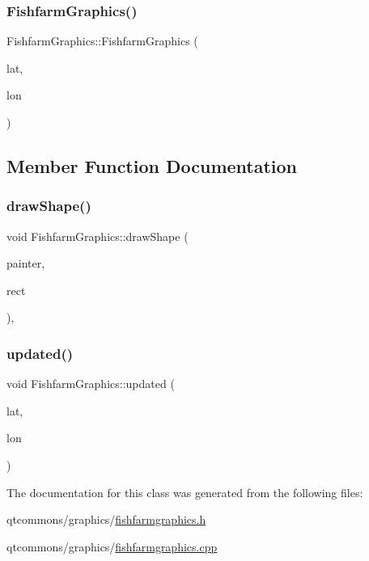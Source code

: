 \subsubsection{\texorpdfstring{FishfarmGraphics()}{FishfarmGraphics()}}
{\footnotesize\ttfamily Fishfarm\+Graphics\+::\+Fishfarm\+Graphics (\begin{DoxyParamCaption}\item[{float}]{lat,  }\item[{float}]{lon }\end{DoxyParamCaption})}



\subsection{Member Function Documentation}
\mbox{\label{class_fishfarm_graphics_a019d2e0e77ddf4c95ab3a47d914b18d9}} 
\subsubsection{\texorpdfstring{drawShape()}{drawShape()}}
{\footnotesize\ttfamily void Fishfarm\+Graphics\+::draw\+Shape (\begin{DoxyParamCaption}\item[{Q\+Painter \&}]{painter,  }\item[{const qmapcontrol\+::\+Rect\+World\+Px \&}]{rect }\end{DoxyParamCaption})\hspace{0.3cm}{\ttfamily [protected]}, {\ttfamily [virtual]}}

\mbox{\label{class_fishfarm_graphics_ae508f10ff6cadefddf1316a8fa1dd1ae}} 
\subsubsection{\texorpdfstring{updated()}{updated()}}
{\footnotesize\ttfamily void Fishfarm\+Graphics\+::updated (\begin{DoxyParamCaption}\item[{float}]{lat,  }\item[{float}]{lon }\end{DoxyParamCaption})}



The documentation for this class was generated from the following files\+:\begin{DoxyCompactItemize}
\item 
qtcommons/graphics/\mbox{\hyperlink{fishfarmgraphics_8h}{fishfarmgraphics.\+h}}\item 
qtcommons/graphics/\mbox{\hyperlink{fishfarmgraphics_8cpp}{fishfarmgraphics.\+cpp}}\end{DoxyCompactItemize}
